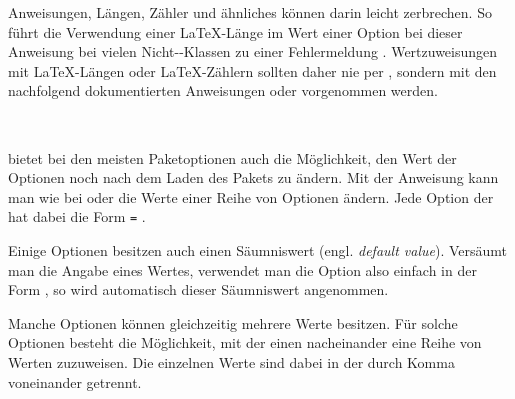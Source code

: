 %
Anweisungen, Längen, Zähler und ähnliches können darin leicht zerbrechen. So
führt die Verwendung einer \LaTeX-Länge im Wert einer Option bei dieser
Anweisung bei vielen Nicht-\KOMAScript-Klassen zu einer Fehlermeldung%
%
. Wertzuweisungen mit \LaTeX-Längen oder \LaTeX-Zählern sollten daher nie per
, sondern mit den nachfolgend dokumentierten Anweisungen
 oder 
vorgenommen werden.%
\EndIndexGroup


\begin{Declaration}
  \\
\end{Declaration}
\KOMAScript{} bietet bei den meisten
Paketoptionen
auch die Möglichkeit, den Wert der Optionen noch nach dem Laden
des Pakets zu ändern. Mit der Anweisung  kann man wie bei
 oder
 die Werte einer Reihe von
Optionen ändern. Jede Option der  hat dabei die Form
\texttt{=}%
.

Einige Optionen besitzen auch einen Säumniswert (engl. \emph{default
  value}). Versäumt man die Angabe eines Wertes, verwendet man die Option also
einfach in der Form , so wird automatisch dieser Säumniswert
angenommen.

Manche Optionen können gleichzeitig mehrere Werte besitzen. Für solche
Optionen besteht die Möglichkeit, mit  der einen
 nacheinander eine Reihe von Werten zuzuweisen. Die einzelnen
Werte sind dabei in der
 durch Komma
voneinander getrennt.

